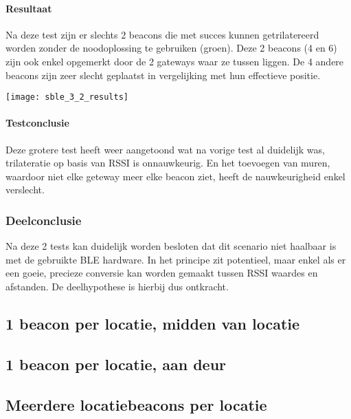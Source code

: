 \paragraph{Resultaat}
\begin{minipage}{0.55\textwidth}
Na deze test zijn er slechts 2 beacons die met succes kunnen getrilatereerd worden zonder de noodoplossing te gebruiken (groen). Deze 2 beacons (4 en 6) zijn ook enkel opgemerkt door de 2 gateways waar ze tussen liggen. De 4 andere beacons zijn zeer slecht geplaatst in vergelijking met hun effectieve positie.
\end{minipage}
\hfill
\begin{minipage}{0.42\textwidth}
	\texttt{[image: sble\_3\_2\_results]}
\end{minipage}

\paragraph{Testconclusie}
Deze grotere test heeft weer aangetoond wat na vorige test al duidelijk was, trilateratie op basis van RSSI is onnauwkeurig. En het toevoegen van muren, waardoor niet elke geteway meer elke beacon ziet, heeft de nauwkeurigheid enkel verslecht.

\subsubsection{Deelconclusie}
Na deze 2 tests kan duidelijk worden besloten dat dit scenario niet haalbaar is met de gebruikte BLE hardware. In het principe zit potentieel, maar enkel als er een goeie, precieze conversie kan worden gemaakt tussen RSSI waardes en afstanden. De deelhypothese is hierbij dus ontkracht.

\subsection{1 beacon per locatie, midden van locatie}

\subsection{1 beacon per locatie, aan deur}

\subsection{Meerdere locatiebeacons per locatie}

